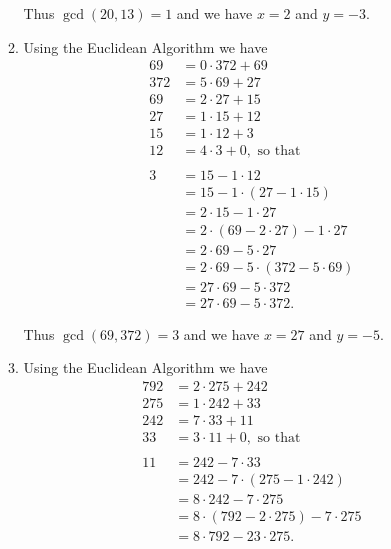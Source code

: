 \begin{enumerate}
\begin{enumerate}
               Thus $\gcd(20, 13) = 1$ and we have $x = 2$ and $y = -3$.
         \item Using the Euclidean Algorithm we have
               \begin{align*}
                  69  &= 0 \cdot 372 + 69 \\
                  372 &= 5 \cdot 69 + 27 \\
                  69  &= 2 \cdot 27 + 15 \\
                  27  &= 1 \cdot 15 + 12 \\
                  15  &= 1 \cdot 12 + 3 \\
                  12  &= 4 \cdot 3 + 0, \text{ so that } \\ \\
                   3 &= 15 - 1 \cdot 12 \\
                     &= 15 - 1 \cdot (27 - 1 \cdot 15) \\
                     &= 2 \cdot 15 - 1 \cdot 27 \\
                     &= 2 \cdot (69 - 2 \cdot 27) - 1 \cdot 27 \\
                     &= 2 \cdot 69 - 5 \cdot 27 \\
                     &= 2 \cdot 69 - 5 \cdot (372 - 5 \cdot 69) \\
                     &= 27 \cdot 69 - 5 \cdot 372 \\
                     &= 27 \cdot 69 - 5 \cdot 372.
               \end{align*}

               Thus $\gcd(69, 372) = 3$ and we have $x = 27$ and $y = -5$.
         \item Using the Euclidean Algorithm we have
               \begin{align*}
                  792 &= 2 \cdot 275 + 242 \\
                  275 &= 1 \cdot 242 + 33 \\
                  242 &= 7 \cdot 33 + 11 \\
                  33  &= 3 \cdot 11 + 0, \text{ so that } \\ \\
                  11  &= 242 - 7 \cdot 33 \\
                      &= 242 - 7 \cdot (275 - 1 \cdot 242) \\
                      &= 8 \cdot 242 - 7 \cdot 275 \\
                      &= 8 \cdot (792 - 2 \cdot 275) - 7 \cdot 275 \\
                      &= 8 \cdot 792 - 23 \cdot 275.
               \end{align*}


\end{enumerate}
\end{enumerate}
